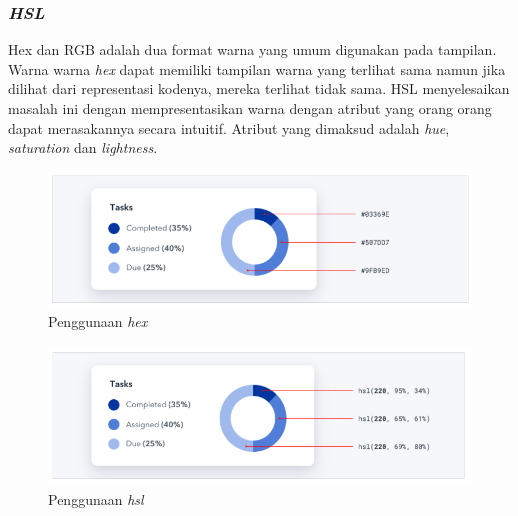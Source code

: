 \subsubsection{\textit{HSL}} Hex dan RGB adalah dua format warna yang umum digunakan pada tampilan. Warna warna \textit{hex} dapat memiliki tampilan warna yang terlihat sama namun jika dilihat dari representasi kodenya, mereka terlihat tidak sama. HSL menyelesaikan masalah ini dengan mempresentasikan warna dengan atribut yang orang orang dapat merasakannya secara intuitif. Atribut yang dimaksud adalah \textit{hue}, \textit{saturation} dan \textit{lightness}.


\begin{figure}[H]
	{\centering
		\includegraphics[keepaspectratio, width=12cm]{gambar/refactoring-ui-g24.png}
		\caption{Penggunaan \textit{hex} \citep{refactoringui}}}
	\label{gambar:refactoring-ui-g24.png}
\end{figure}

\begin{figure}[H]
	{\centering
		\includegraphics[keepaspectratio, width=12cm]{gambar/hsl-1.png}
		\caption{Penggunaan \textit{hsl} \citep{refactoringui}}}
	\label{gambar:hsl-1.png}
\end{figure}

